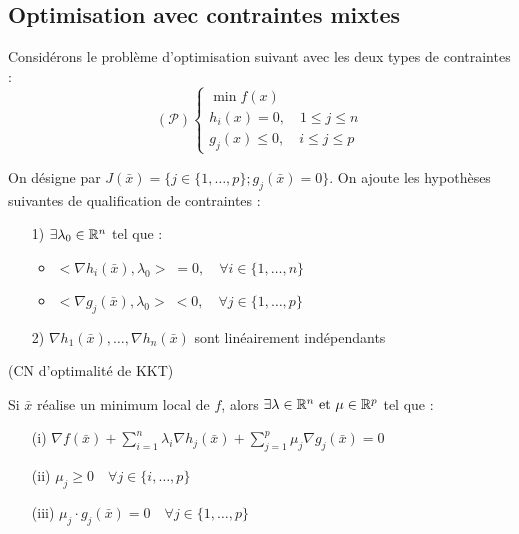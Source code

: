 \subsection{Optimisation avec contraintes mixtes}

Considérons le problème d'optimisation suivant avec les deux types de contraintes : \[ (\mathcal{P}) \begin{cases}\min f(x) \\ h_i(x) = 0 , \quad 1 \leq j \leq n \\ g_j(x) \leq 0 , \quad i \leq j \leq p \end{cases} \]

On désigne par $J(\bar{x})=\{j \in \{1, \dots , p\}; g_j(\bar{x}) = 0\}$.
On ajoute les hypothèses suivantes de qualification de contraintes :
\begin{itemize}
	\item[1)] $\exists \lambda_0 \in \mathbb{R}^n$ tel que :
	\begin{itemize}
		\item $<\nabla h_i(\bar{x}), \lambda_0> \; = 0, \quad \forall i \in \{ 1, \dots , n \}$
		\item $<\nabla g_j(\bar{x}), \lambda_0> \; < 0, \quad \forall j \in \{ 1, \dots , p \}$
	\end{itemize}
	\item[2)] $\nabla h_1(\bar{x}), \dots, \nabla h_n(\bar{x})$ sont linéairement indépendants
\end{itemize}

\begin{theoreme} (CN d'optimalité de KKT)

Si $\bar{x}$ réalise un minimum local de $f$, alors $\exists \lambda \in \mathbb{R}^n \text{  et } \mu \in \mathbb{R}^p$ tel que :
	\begin{itemize}
		\item[(i)] $\displaystyle \nabla f(\bar{x}) + \sum_{i=1}^n \lambda _i \nabla h_j (\bar{x}) + \sum_{j=1}^p \mu _j \nabla g_j (\bar{x}) = 0$
		\item[(ii)] $ \mu _j \geq 0 \quad \forall j \in \{ i, \dots , p \}$
		\item[(iii)] $ \mu _j \cdot g_j(\bar{x}) = 0 \quad \forall j \in \{ 1, \dots , p \}$
	\end{itemize}
\end{theoreme}

